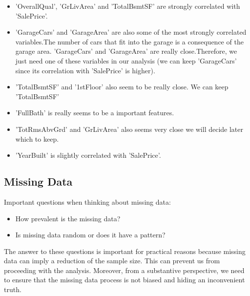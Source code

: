 \documentclass[11pt, a4paper , landscape]{article}
\providecommand{\tightlist}{%
      \setlength{\itemsep}{0pt}\setlength{\parskip}{0pt}}
\begin{document}
\begin{itemize}
\item
  'OverallQual', 'GrLivArea' and 'TotalBsmtSF' are strongly correlated
  with 'SalePrice'.
\item
  'GarageCars' and 'GarageArea' are also some of the most strongly
  correlated variables.The number of cars that fit into the garage is a
  consequence of the garage area. 'GarageCars' and 'GarageArea' are
  really close.Therefore, we just need one of these variables in our
  analysis (we can keep 'GarageCars' since its correlation with
  'SalePrice' is higher).
\item
  'TotalBsmtSF' and '1stFloor' also seem to be really close. We can keep
  'TotalBsmtSF'
\item
  'FullBath' is really seems to be a important features.
\item
  'TotRmsAbvGrd' and 'GrLivArea' also seems very close we will decide
  later which to keep.
\item
  'YearBuilt' is slightly correlated with 'SalePrice'.
\end{itemize}

    \subsection{Missing Data}\label{missing-data}

    Important questions when thinking about missing data:

\begin{itemize}
\tightlist
\item
  How prevalent is the missing data?
\item
  Is missing data random or does it have a pattern?
\end{itemize}

The answer to these questions is important for practical reasons because
missing data can imply a reduction of the sample size. This can prevent
us from proceeding with the analysis. Moreover, from a substantive
perspective, we need to ensure that the missing data process is not
biased and hiding an inconvenient truth.
\end{document}
